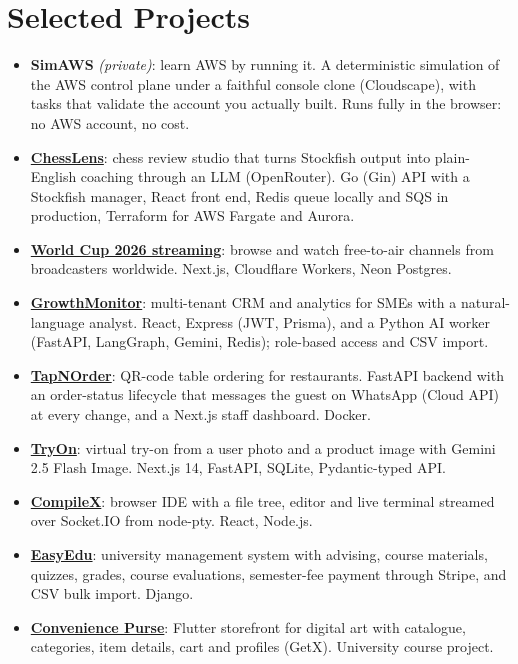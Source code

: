 \documentclass[10pt,a4paper]{article}
\newcommand{\lnk}[2]{\href{#1}{\color{accent}#2}}
\begin{document}
\section{Selected Projects}
\begin{itemize}
  \item \textbf{SimAWS} \textit{(private)}: learn AWS by running it. A deterministic simulation of the AWS control plane
        under a faithful console clone (Cloudscape), with tasks that validate the account you actually built. Runs fully
        in the browser: no AWS account, no cost.
  \item \lnk{https://github.com/shihabshahrier/ChessGoddess}{\textbf{ChessLens}}: chess review studio that turns Stockfish
        output into plain-English coaching through an LLM (OpenRouter). Go (Gin) API with a Stockfish manager, React front end,
        Redis queue locally and SQS in production, Terraform for AWS Fargate and Aurora.
  \item \lnk{https://github.com/shihabshahrier/iptv-platform}{\textbf{World Cup 2026 streaming}}: browse and watch
        free-to-air channels from broadcasters worldwide. Next.js, Cloudflare Workers, Neon Postgres.
  \item \lnk{https://github.com/shihabshahrier/growth-monitor}{\textbf{GrowthMonitor}}: multi-tenant CRM and analytics for
        SMEs with a natural-language analyst. React, Express (JWT, Prisma), and a Python AI worker (FastAPI, LangGraph, Gemini,
        Redis); role-based access and CSV import.
  \item \lnk{https://github.com/shihabshahrier/TapNOrder}{\textbf{TapNOrder}}: QR-code table ordering for restaurants.
        FastAPI backend with an order-status lifecycle that messages the guest on WhatsApp (Cloud API) at every change,
        and a Next.js staff dashboard. Docker.
  \item \lnk{https://github.com/shihabshahrier/TryOn-POC}{\textbf{TryOn}}: virtual try-on from a user photo and a product
        image with Gemini 2.5 Flash Image. Next.js 14, FastAPI, SQLite, Pydantic-typed API.
  \item \lnk{https://github.com/shihabshahrier/CompileX}{\textbf{CompileX}}: browser IDE with a file tree, editor and live
        terminal streamed over Socket.IO from node-pty. React, Node.js.
  \item \lnk{https://github.com/shihabshahrier/EasyEdu}{\textbf{EasyEdu}}: university management system with advising,
        course materials, quizzes, grades, course evaluations, semester-fee payment through Stripe, and CSV bulk import. Django.
  \item \lnk{https://github.com/shihabshahrier/ConvenientPurse}{\textbf{Convenience Purse}}: Flutter storefront for digital
        art with catalogue, categories, item details, cart and profiles (GetX). University course project.
\end{itemize}
\end{document}
